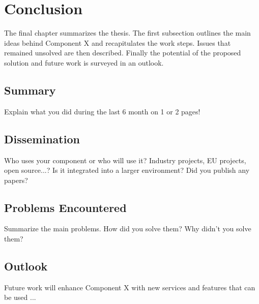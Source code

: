 \chapter{Conclusion\label{cha:chapter7}}

The final chapter summarizes the thesis. The first subsection outlines the main ideas
behind Component X and recapitulates the work steps. Issues that remained unsolved are
then described. Finally the potential of the proposed solution and future work is
surveyed in an outlook.

\section{Summary\label{sec:summary}}

Explain what you did during the last 6 month on 1 or 2 pages!

\section{Dissemination\label{sec:dissemination}}

Who uses your component or who will use it? Industry projects, EU projects,
open source...? Is it integrated into a larger environment? Did you publish any papers?

\section{Problems Encountered\label{sec:problems}}

Summarize the main problems. How did you solve them? Why didn't you solve them?

\section{Outlook\label{sec:outlook}}

Future work will enhance Component X with new services and features that can be used ...

